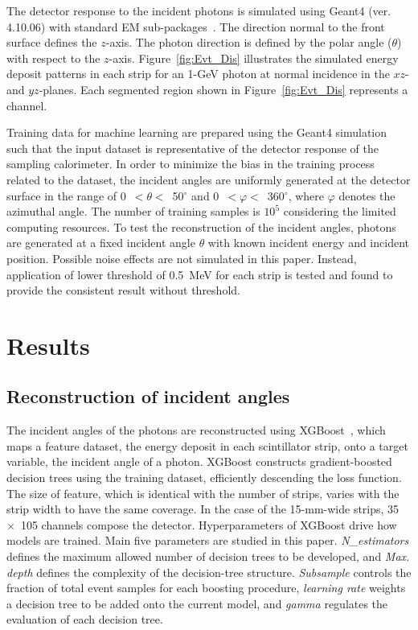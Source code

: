 \documentclass[12pt,times,draftclsnofoot,a4paper]{elsarticle}
\begin{document}
The detector response to the incident photons is simulated using Geant4 (ver. 4.10.06) with standard EM sub-packages~\cite{GEANT4}. The direction normal to the front surface defines the $z$-axis. The photon direction is defined by the polar angle ($\theta$) with respect to the $z$-axis. Figure~\ref{fig:Evt_Dis} illustrates the simulated energy deposit patterns in each strip for an 1-GeV photon at normal incidence in the $xz$- and $yz$-planes. Each segmented region shown in Figure~\ref{fig:Evt_Dis} represents a channel. 

Training data for machine learning are prepared using the Geant4 simulation such that the input dataset is representative of the detector response of the sampling calorimeter. In order to minimize the bias in the training process related to the dataset, the incident angles are uniformly generated at the detector surface in the range of 0~$<\theta<$~50$^{\circ}$ and 0~$<\varphi<$~360$^{\circ}$, where $\varphi$ denotes the azimuthal angle. The number of training samples is $10^{5}$ considering the limited computing resources. To test the reconstruction of the incident angles, photons are generated at a fixed incident angle $\theta$ with known incident energy and incident position.
Possible noise effects are not simulated in this paper. Instead, application of lower threshold of 0.5~MeV for each strip is tested and found to provide the consistent result without threshold. %
\section{Results}
\label{sec:res}
\subsection{Reconstruction of incident angles}
\label{sec:reco}

The incident angles of the photons are reconstructed using XGBoost~\cite{xgboost:2016}, which maps a feature dataset, the energy deposit in each scintillator strip, onto a target variable, the incident angle of a photon. XGBoost constructs  gradient-boosted decision trees using the training dataset, efficiently descending the loss function. The size of feature, which is identical with the number of strips, varies with the strip width to have the same coverage. In the case of the 15-mm-wide strips, 35~$\times$~105 channels compose the detector. Hyperparameters of XGBoost drive how models are trained. Main five parameters are studied in this paper. \textit{N\_estimators} defines the maximum allowed number of decision trees to be developed, and  \textit{Max. depth} defines the complexity of the decision-tree structure.  \textit{Subsample} controls the fraction of total event samples for each boosting procedure,  \textit{learning rate} weights a decision tree to be added onto the current model, and  \textit{gamma} regulates the evaluation of each decision tree. 
\end{document}
